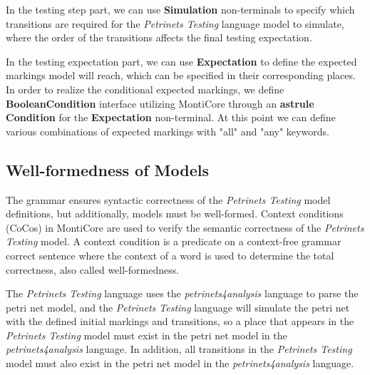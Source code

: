 In the testing step part, we can use \textbf{Simulation} non-terminals to specify which transitions are required for the \emph{Petrinets Testing} language model to simulate, where the order of the transitions affects the final testing expectation.

In the testing expectation part, we can use \textbf{Expectation} to define the expected markings model will reach, which can be specified in their corresponding places. In order to realize the conditional expected markings, we define \textbf{BooleanCondition} interface utilizing MontiCore through an \textbf{astrule} \textbf{Condition} for the \textbf{Expectation} non-terminal. At this point we can define various combinations of expected markings with "all" and "any" keywords.

\subsection{Well-formedness of Models}\label{sec:lang:semantics}

The grammar ensures syntactic correctness of the \emph{Petrinets Testing} model definitions, but additionally, models must be well-formed. Context conditions (CoCos) in MontiCore are used to verify the semantic correctness of the \emph{Petrinets Testing} model. A context condition is a predicate on a context-free grammar correct sentence where the context of a word is used to determine the total correctness, also called well-formedness\cite{rumpe2017monticore}. 

The \emph{Petrinets Testing} language uses the \emph{petrinets4analysis} language to parse the petri net model, and the \emph{Petrinets Testing} language will simulate the petri net with the defined initial markings and transitions, so a place that appears in the \emph{Petrinets Testing} model must exist in the petri net model in the \emph{petrinets4analysis} language. In addition, all transitions in the \emph{Petrinets Testing} model must also exist in the petri net model in the \emph{petrinets4analysis} language.